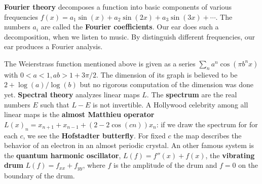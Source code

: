 \documentclass[12pt]{amsart}
\begin{document}
{\bf Fourier theory} decomposes a function into basic components of various frequencies 
$f(x) = a_1 \sin(x) + a_2 \sin(2x) + a_3 \sin(3x) + \cdots$.  The numbers $a_i$ are called 
the {\bf Fourier coefficients}. Our ear does such a decomposition, when we listen to music. 
By distinguish different frequencies, our ear produces a Fourier analysis. 

\parbox{16.8cm}{
\parbox{6cm}{
}}

The Weierstrass function mentioned above is given as a series
$\sum_n a^n \cos(\pi b^n x)$ with $0<a<1,  ab> 1+3\pi/2$. The dimension of its graph 
is believed to be $2+\log(a)/\log(b)$ but no rigorous computation of the dimension was done yet. 
{\bf Spectral theory} analyzes linear maps $L$. The {\bf spectrum}
are the real numbers $E$ such that $L-E$ is not invertible. A Hollywood celebrity among all linear
maps is the {\bf almost Matthieu operator} $L(x)_n = x_{n+1} + x_{n-1} + (2-2 \cos(c n)) x_n$: 
if we draw the spectrum for for each $c$, we see the 
{\bf Hofstadter butterfly}. For fixed $c$ the map describes the behavior of an electron 
in an almost periodic crystal. 
An other famous system is the {\bf quantum harmonic oscillator},
$L(f) = f ''(x) + f(x)$, the {\bf vibrating drum} $L(f) = f_{xx} + f_{yy}$, where $f$ is the 
amplitude of the drum and $f=0$ on the boundary of the drum.  \\

\parbox{16.8cm}{
\parbox{6cm}{
}
}
\end{document}
